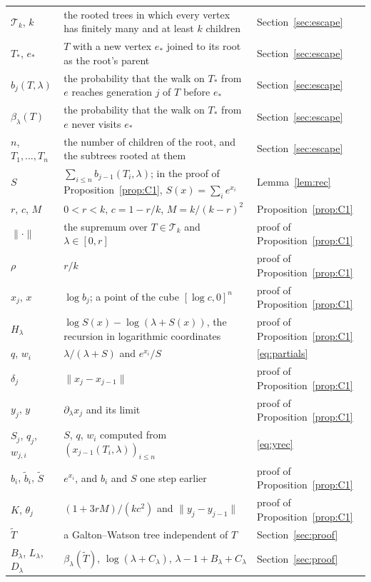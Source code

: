 \documentclass[11pt]{amsart}
\theoremstyle{definition}
\newcommand{\cT}{\mathcal{T}}
\begin{document}
{\begin{longtable}{@{}lp{}p{}@{}}
$\cT_k$, $k$ & the rooted trees in which every vertex has finitely many and at least $k$ children & Section~\ref{sec:escape}\\
$T_*$, $e_*$ & $T$ with a new vertex $e_*$ joined to its root as the root's parent & Section~\ref{sec:escape}\\
$b_j(T,\lambda)$ & the probability that the walk on $T_*$ from $e$ reaches generation $j$ of $T$ before $e_*$ & Section~\ref{sec:escape}\\
$\beta_\lambda(T)$ & the probability that the walk on $T_*$ from $e$ never visits $e_*$ & Section~\ref{sec:escape}\\
$n$, $T_1,\dots,T_n$ & the number of children of the root, and the subtrees rooted at them & Section~\ref{sec:escape}\\
$S$ & $\sum_{i\le n}b_{j-1}(T_i,\lambda)$; in the proof of Proposition~\ref{prop:C1}, $S(x)=\sum_ie^{x_i}$ & Lemma~\ref{lem:rec}\\
$r$, $c$, $M$ & $0<r<k$, $c=1-r/k$, $M=k/(k-r)^2$ & Proposition~\ref{prop:C1}\\
$\|\cdot\|$ & the supremum over $T\in\cT_k$ and $\lambda\in[0,r]$ & proof of Proposition~\ref{prop:C1}\\
$\rho$ & $r/k$ & proof of Proposition~\ref{prop:C1}\\
$x_j$, $x$ & $\log b_j$; a point of the cube $[\log c,0]^n$ & proof of Proposition~\ref{prop:C1}\\
$H_\lambda$ & $\log S(x)-\log(\lambda+S(x))$, the recursion in logarithmic coordinates & proof of Proposition~\ref{prop:C1}\\
$q$, $w_i$ & $\lambda/(\lambda+S)$ and $e^{x_i}/S$ & \eqref{eq:partials}\\
$\delta_j$ & $\|x_j-x_{j-1}\|$ & proof of Proposition~\ref{prop:C1}\\
$y_j$, $y$ & $\partial_\lambda x_j$ and its limit & proof of Proposition~\ref{prop:C1}\\
$S_j$, $q_j$, $w_{j,i}$ & $S$, $q$, $w_i$ computed from $(x_{j-1}(T_i,\lambda))_{i\le n}$ & \eqref{eq:yrec}\\
$b_i$, $\tilde b_i$, $\tilde S$ & $e^{x_i}$, and $b_i$ and $S$ one step earlier & proof of Proposition~\ref{prop:C1}\\
$K$, $\theta_j$ & $(1+3rM)/(kc^2)$ and $\|y_j-y_{j-1}\|$ & proof of Proposition~\ref{prop:C1}\\
$\tilde T$ & a Galton--Watson tree independent of $T$ & Section~\ref{sec:proof}\\
$B_\lambda$, $L_\lambda$, $D_\lambda$ & $\beta_\lambda(\tilde T)$, $\log(\lambda+C_\lambda)$, $\lambda-1+B_\lambda+C_\lambda$ & Section~\ref{sec:proof}\\

\end{longtable}}
\end{document}
